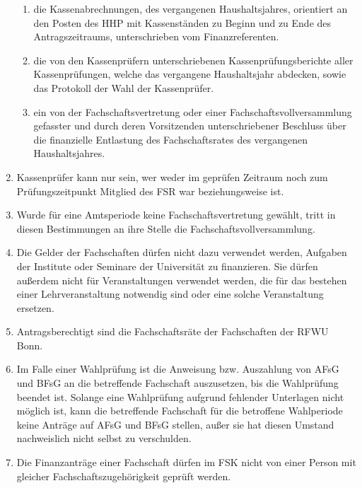 \documentclass{article}
\begin{document}
\begin{enumerate}[(1)]
\begin{enumerate}[1.]
        \item die Kassenabrechnungen, des vergangenen Haushaltsjahres, orientiert an den Posten des HHP mit Kassenständen zu Beginn und zu Ende des Antragszeitraums, unterschrieben vom Finanzreferenten.
        \item die von den Kassenprüfern unterschriebenen Kassenprüfungsberichte aller Kassenprüfungen, welche das vergangene Haushaltsjahr abdecken, sowie das Protokoll der Wahl der Kassenprüfer.
        \item ein von der Fachschaftsvertretung oder einer Fachschaftsvollversammlung gefasster und durch deren Vorsitzenden unterschriebener Beschluss über die finanzielle  Entlastung des Fachschaftsrates des vergangenen Haushaltsjahres.
    \end{enumerate}
    \item Kassenprüfer kann nur sein, wer weder im geprüfen Zeitraum noch zum Prüfungszeitpunkt Mitglied des FSR war beziehungsweise ist.
    \item Wurde für eine Amtsperiode keine Fachschaftsvertretung gewählt, tritt in diesen Bestimmungen an ihre Stelle die Fachschaftsvollversammlung.
    \item Die Gelder der Fachschaften dürfen nicht dazu verwendet werden, Aufgaben der Institute oder Seminare der Universität zu finanzieren. 
    	Sie dürfen außerdem nicht für Veranstaltungen verwendet werden, die für das bestehen einer Lehrveranstaltung notwendig sind oder eine solche Veranstaltung ersetzen.
    \item Antragsberechtigt sind die Fachschaftsräte der Fachschaften der RFWU Bonn.
    \item Im Falle einer Wahlprüfung ist die Anweisung bzw. Auszahlung von AFsG und BFsG an die betreffende Fachschaft auszusetzen, bis die Wahlprüfung beendet ist. 
    	Solange eine Wahlprüfung aufgrund fehlender Unterlagen nicht möglich ist, kann die betreffende Fachschaft für die betroffene Wahlperiode keine Anträge auf AFsG und BFsG stellen, außer sie hat diesen Umstand nachweislich nicht selbst zu verschulden.
    \item Die Finanzanträge einer Fachschaft dürfen im FSK nicht von einer Person mit gleicher Fachschaftszugehörigkeit geprüft werden.

\end{enumerate}
\end{document}
